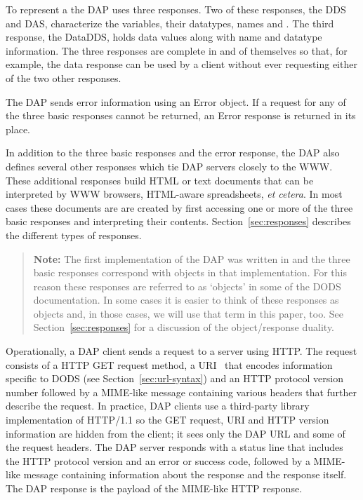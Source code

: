 \documentclass{article}
\begin{document}
To represent a  the \ac{DAP} uses three responses.
Two of these responses, the \ac{DDS} and \ac{DAS}, characterize the
variables, their datatypes, names and . The
third response, the \ac{DataDDS}, holds data values along with name and
datatype information.  The three responses are complete in and of themselves
so that, for example, the data response can be used by a client without ever
requesting either of the two other responses.

The \ac{DAP} sends error information using an Error object. If a request for
any of the three basic responses cannot be returned, an Error response is
returned in its place.

In addition to the three basic responses and the error response, the \ac{DAP}
also defines several other responses which tie \ac{DAP} servers closely to
the \ac{WWW}. These additional responses build \ac{HTML} or text documents
that can be interpreted by \ac{WWW} browsers, \ac{HTML}-aware spreadsheets,
\emph{et cetera}. In most cases these documents are are created by first
accessing one or more of the three basic responses and interpreting their
contents.  Section~\ref{sec:responses} describes the different types of
responses.

\begin{quote}
  \textbf{Note:} The first implementation of the \ac{DAP} was written in \Cpp
  and the three basic responses correspond with objects in that
  implementation. For this reason these responses are referred to as
  `objects' in some of the \ac{DODS} documentation. In some cases it is
  easier to think of these responses as objects and, in those cases, we will
  use that term in this paper, too. See Section~\ref{sec:responses} for a
  discussion of the object/response duality.
\end{quote}

Operationally, a \ac{DAP} client sends a request to a server using \ac{HTTP}.
The request consists of a \ac{HTTP} GET request method, a
\ac{URI}~\cite{rfc2396} that encodes information specific to DODS (see
Section~\ref{sec:url-syntax}) and an \ac{HTTP} protocol version number
followed by a MIME-like message containing various headers that further
describe the request. In practice, DAP clients use a third-party library
implementation of \ac{HTTP}/1.1 so the GET request, \ac{URI} and \ac{HTTP}
version information are hidden from the client; it sees only the \ac{DAP}
\ac{URL} and some of the request headers. The \ac{DAP} server responds with a
status line that includes the \ac{HTTP} protocol version and an error or
success code, followed by a MIME-like message containing information about
the response and the response itself. The \ac{DAP} response is the payload of
the MIME-like \ac{HTTP} response.
\end{document}
